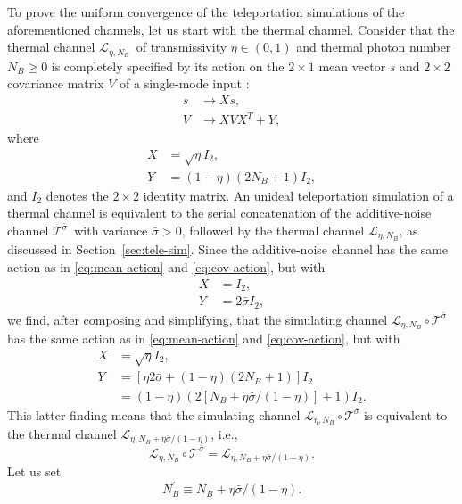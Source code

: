 \documentclass[apsrev,twocolumn]{revtex4-1}%
\begin{document}
To prove the uniform convergence of the teleportation simulations of the
aforementioned channels, let us start with the thermal channel. Consider that
the thermal channel $\mathcal{L}_{\eta,N_{B}}$\ of transmissivity $\eta
\in(0,1)$ and thermal photon number $N_{B}\geq0$ is completely specified by
its action on the $2\times1$ mean vector $s$ and $2\times2$ covariance matrix
$V$ of a single-mode input \cite{S17}:%
\begin{align}
s  &  \rightarrow Xs,\label{eq:mean-action}\\
V  &  \rightarrow XVX^{T}+Y, \label{eq:cov-action}%
\end{align}
where%
\begin{align}
X  &  =\sqrt{\eta}I_{2},\\
Y  &  =(1-\eta)(2N_{B}+1)I_{2},
\end{align}
and $I_{2}$ denotes the $2\times2$ identity matrix. An unideal teleportation
simulation of a thermal channel is equivalent to the serial concatenation of
the additive-noise channel $\mathcal{T}^{\bar{\sigma}}$\ with variance
$\bar{\sigma}>0$, followed by the thermal channel $\mathcal{L}_{\eta,N_{B}}$,
as discussed in Section~\ref{sec:tele-sim}. Since the additive-noise channel
has the same action as in \eqref{eq:mean-action} and \eqref{eq:cov-action},
but with%
\begin{align}
X  &  =I_{2},\\
Y  &  = 2 \bar{\sigma}I_{2},
\end{align}
we find, after composing and simplifying, that the simulating channel
$\mathcal{L}_{\eta,N_{B}}\circ\mathcal{T}^{\bar{\sigma}}$ has the same action
as in \eqref{eq:mean-action} and \eqref{eq:cov-action}, but with%
\begin{align}
X  &  =\sqrt{\eta}I_{2},\\
Y  &  =\left[  \eta2 \bar{\sigma}+(1-\eta)(2N_{B}+1)\right]  I_{2}\\
&  =(1-\eta)(2\left[  N_{B}+\eta\bar{\sigma}/(1-\eta)\right]  +1)I_{2}.
\end{align}
This latter finding means that the simulating channel $\mathcal{L}_{\eta
,N_{B}}\circ\mathcal{T}^{\bar{\sigma}}$ is equivalent to the thermal channel
$\mathcal{L}_{\eta,N_{B}+\eta\bar{\sigma}/(1-\eta)}$, i.e.,%
\begin{equation}
\mathcal{L}_{\eta,N_{B}}\circ\mathcal{T}^{\bar{\sigma}}=\mathcal{L}%
_{\eta,N_{B}+\eta\bar{\sigma}/(1-\eta)}. \label{eq:tp-sim-therm-is-therm}%
\end{equation}
Let us set%
\begin{equation}
N_{B}^{\prime}\equiv N_{B}+\eta\bar{\sigma}/(1-\eta).
\end{equation}
\end{document}
